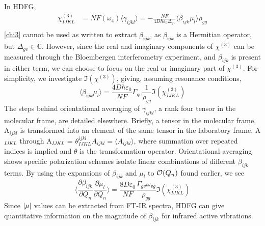 \documentclass[aip, jcp, reprint, onecolumn]{revtex4-2}
\begin{document}
In HDFG, 
\begin{equation}\label{chi3}
\begin{split}
		\chi^{(3)}_{IJKL} &= NF(\omega_4) \langle \gamma_{ijkl} \rangle = -\frac{NF}{4D \hbar \varepsilon_0 \Delta_{gv}} \langle \beta_{ijk} \mu_l \rangle \rho_{gg}\\
\end{split}
\end{equation}
\autoref{chi3} cannot be used as written to extract $\beta_{ijk}$, as $\beta_{ijk}$ is a Hermitian operator, but $\Delta_{gv} \in \mathbb{C}$. 
However, since the real and imaginary components of $\chi^{(3)}$ can be measured through the Bloembergen interferometry experiment, and $\beta_{ijk}$ is present in either term, we can choose to focus on the real or imaginary part of $\chi^{(3)}$.
For simplicity, we investigate $\Im(\chi^{(3)})$, giving, assuming resonance conditions, 
\begin{equation}
	\langle \beta_{ijk} \mu_{l} \rangle = \frac{4D \hbar \varepsilon_0}{NF} \Gamma_{gv} \frac{1}{\rho_{gg}} \Im(\chi^{(3)}_{IJKL})
\end{equation}
The steps behind orientational averaging of $\gamma_{ijkl}$, a rank four tensor in the molecular frame, are detailed elsewhere.\cite{Andrews1977, McDonnell2024}
Briefly, a tensor in the molecular frame, A$_{ijkl}$ is transformed into an element of the same tensor in the laboratory frame, A$_{IJKL}$ through A$_{IJKL}$ = $\theta^{ijkl}_{IJKL} A_{ijkl} = \langle A_{ijkl} \rangle$, where summation over repeated indices is implied and $\theta$ is the transformation operator. \cite{McDonnell2024}
Orientational averaging shows specific polarization schemes isolate linear combinations of different $\beta_{ijk}$ terms. \cite{Cyvin1965, Bersohn1966}
By using the expansions of $\beta_{ijk}$ and $\mu_{l}$ to $\order{Q_n}$ found earlier, we see
\begin{equation}\label{betasive}
	\langle \frac{\partial \beta_{ijk}}{\partial Q_n} {\frac{\partial \mu_l}{\partial Q_n}} \rangle = \frac{8D \varepsilon_0}{NF}  \frac{\Gamma_{gv} \omega_{vg}}{\rho_{gg}} {\Im(\chi^{(3)}_{IJKL})}
\end{equation}
Since $\abs{\mu}$ values can be extracted from FT-IR spectra,\cite{McDonnell2024} HDFG can give quantitative information on the magnitude of $\beta_{ijk}$ for infrared active vibrations.
\end{document}
